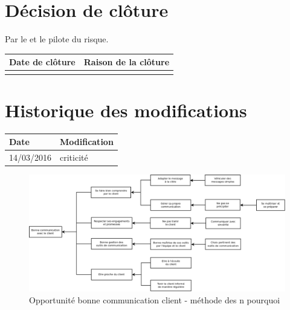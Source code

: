 \section*{Décision de clôture}
Par le \CP{} et le pilote du risque.
\begin{table}[h]
\centering
	\begin{tabularx}{16.8cm}{|X|X|}
	\hline
	\rowcolor{gray!40} Date de clôture & Raison de la clôture \\
	\hline
	  & \\
	\hline
	\end{tabularx}
\end{table}

\section*{Historique des modifications}
\begin{table}[h]
\centering
	\begin{tabularx}{16.8cm}{|X|X|}
	\hline
	\rowcolor{gray!40} Date & Modification \\%
	\hline
	 14/03/2016 & criticité \\
	\hline
	\end{tabularx}
\end{table}
\newpage


\begin{figure}
	\centering
	\includegraphics[scale=0.28]{images/AnalyseOpportunite_nPourquoi_FDO004}
	\caption{\label{opportunite bonne communication client}Opportunité bonne communication client - méthode des n pourquoi}
\end{figure}
